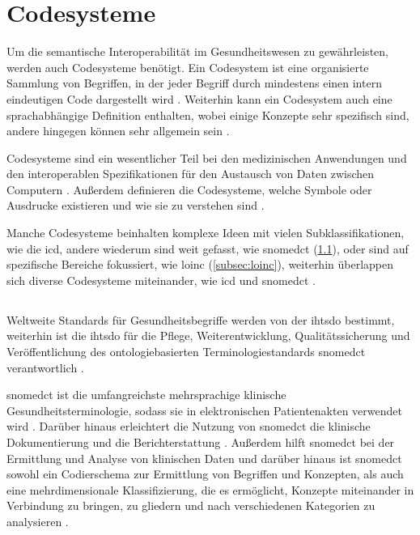 \section{Codesysteme} \label{sec:codesys}

Um die semantische Interoperabilität im Gesundheitswesen zu gewährleisten, werden auch Codesysteme benötigt. Ein Codesystem ist eine organisierte Sammlung von Begriffen, in der jeder Begriff durch mindestens einen intern eindeutigen Code dargestellt wird \cite{bluecodesy}. Weiterhin kann ein Codesystem auch eine sprachabhängige Definition enthalten, wobei einige Konzepte sehr spezifisch sind, andere hingegen können sehr allgemein sein \cite{interop, bluecodesy}.

Codesysteme sind ein wesentlicher Teil bei den medizinischen Anwendungen und den interoperablen Spezifikationen für den Austausch von Daten zwischen Computern \cite{interop}. Außerdem definieren die Codesysteme, welche Symbole oder Ausdrucke existieren und wie sie zu verstehen sind \cite{interop, fhircodesys}.

Manche Codesysteme beinhalten komplexe Ideen mit vielen Subklassifikationen, wie die \ac{icd}, andere wiederum sind weit gefasst, wie \ac{snomedct} (\ref{subsec:snomed}), oder sind auf spezifische Bereiche fokussiert, wie \ac{loinc} (\ref{subsec:loinc}), weiterhin überlappen sich diverse Codesysteme miteinander, wie \ac{icd} und \ac{snomedct} \cite{bluecodesy}.

\subsection{} \label{subsec:snomed}

Weltweite Standards für Gesundheitsbegriffe werden von der \ac{ihtsdo} bestimmt, weiterhin ist die \ac{ihtsdo} für die Pflege, Weiterentwicklung, Qualitätssicherung und Veröffentlichung des ontologiebasierten Terminologiestandards \ac{snomedct} verantwortlich \cite{snomedofic}. 

\acf{snomedct} ist die umfangreichste mehrsprachige klinische Gesundheitsterminologie, sodass sie in elektronischen Patientenakten verwendet wird \cite{telemedizin, interop}. Darüber hinaus erleichtert die Nutzung von \ac{snomedct} die klinische Dokumentierung und die Berichterstattung \cite{telemedizin}. Außerdem hilft \ac{snomedct} bei der Ermittlung und Analyse von klinischen Daten und darüber hinaus ist \ac{snomedct} sowohl ein Codierschema zur Ermittlung von Begriffen und Konzepten, als auch eine mehrdimensionale Klassifizierung, die es ermöglicht, Konzepte miteinander in Verbindung zu bringen, zu gliedern und nach verschiedenen Kategorien zu analysieren \cite{interop}. 

